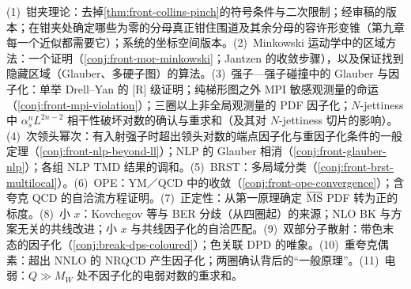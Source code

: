 \begin{remark}[开放问题]\label{rem:front-open}
(1)~钳夹理论：去掉\cref{thm:front-collins-pinch}的符号条件与二次限制；经审稿的版本；在钳夹处确定哪些为零的分母真正钳住围道及其余分母的容许形变锥（第九章每一个近似都需要它）；系统的坐标空间版本。(2)~Minkowski 运动学中的区域方法：一个证明（\cref{conj:front-mor-minkowski}；Jantzen 的收敛步骤），以及保证找到隐藏区域（Glauber、多硬子图）的算法。(3)~强子—强子碰撞中的 Glauber 与因子化：单举 Drell--Yan 的 [R] 级证明；纯梯形图之外 MPI 敏感观测量的命运（\cref{conj:front-mpi-violation}）；三圈以上非全局观测量的 PDF 因子化；$N$-jettiness 中 $\alpha_s^nL^{2n-2}$ 相干性破坏对数的确认与重求和（及其对 $N$-jettiness 切片的影响）。(4)~次领头幂次：有入射强子时超出领头对数的端点因子化与重因子化条件的一般定理（\cref{conj:front-nlp-beyond-ll}）；NLP 的 Glauber 相消（\cref{conj:front-glauber-nlp}）；各组 NLP TMD 结果的调和。(5)~BRST：多局域分类（\cref{conj:front-brst-multilocal}）。(6)~OPE：YM／QCD 中的收敛（\cref{conj:front-ope-convergence}）；含夸克 QCD 的自洽流方程证明。(7)~正定性：从第一原理确定 $\overline{\mathrm{MS}}$ PDF 转为正的标度。(8)~小 $x$：Kovchegov 等与 BER 分歧（从四圈起）的来源；NLO BK 与方案无关的共线改进；小 $x$ 与共线因子化的自洽匹配。(9)~双部分子散射：带色末态的因子化（\cref{conj:break-dps-coloured}）；色关联 DPD 的唯象。(10)~重夸克偶素：超出 NNLO 的 NRQCD 产生因子化；两圈确认背后的“一般原理”。(11)~电弱：$Q\gg M_W$ 处不因子化的电弱对数的重求和。
\end{remark}
